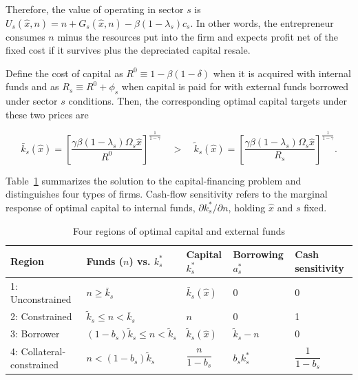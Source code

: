 \documentclass[12pt]{article}
\begin{document}
Therefore, the value of operating in sector $s$ is $U_{s}(\hat x,n)=n+G_{s}(\hat x,n) -\beta(1-\lambda_{s})c_{s}$. In other words, the entrepreneur consumes $n$ minus the resources put into the firm and expects profit net of the fixed cost if it survives plus the depreciated capital resale.

Define the cost of capital as $R^0 \equiv 1-\beta(1-\delta)$ when it is acquired with internal funds and as $R_{s} \equiv R^0+\phi_{s}$ when capital is paid for with external funds borrowed under sector $s$ conditions. Then, the corresponding optimal capital targets under these two prices are

\begin{equation}
  \bar{k}_{s}(\hat x)
    = \left[\frac{\gamma \beta(1-\lambda_{s})\Omega_{s} \hat x}{R^0}\right]^{\frac{1}{1-\gamma}}
  \quad > \quad
  \tilde{k}_{s}(\hat x)
    = \left[\frac{\gamma \beta(1-\lambda_{s})\Omega_{s} \hat x}{R_{s}}\right]^{\frac{1}{1-\gamma}}.
  \label{eq:toy-targets}
\end{equation}

Table~\ref{optimal_k_a} summarizes the solution to the capital-financing problem and distinguishes four types of firms. Cash-flow sensitivity refers to the marginal response of optimal capital to internal funds, $\partial k_s^*/\partial n$, holding $\hat{x}$ and $s$ fixed.
 
\begin{table}[H]
    \caption{Four regions of optimal capital and external funds}
    \label{optimal_k_a}
    \begin{center}
    \renewcommand{\arraystretch}{1.25}\small
    \begin{tabular}{lllll}
        \toprule
         Region & Funds ($n$) vs. $k^{*}_{s}$ & Capital $k^{*}_{s}$ &
         Borrowing $a^{*}_{s}$ & Cash sensitivity \\
        \midrule
        1: Unconstrained & $n\geq\bar k_{s}$ & $\bar k_{s}(\hat{x})$
         & 0 & 0 \\
        2: Constrained & $\tilde k_{s}\leq n<\bar k_{s}$ &
         $n$ & 0 & 1 \\
        3: Borrower & $(1-b_{s})\tilde k_{s}\leq n
         <\tilde k_{s}$ & $\tilde k_{s}(\hat{x})$ & $\tilde k_{s}-n$
         & 0 \\
        4: Collateral-constrained & $n<(1-b_{s})\tilde k_{s}$ &
         $\dfrac{n}{1-b_{s}}$ & $b_{s}k^{*}_{s}$ &
         $\dfrac{1}{1-b_{s}}$ \\
        \bottomrule
    \end{tabular}
\end{center}
\end{table}
 
\end{document}
